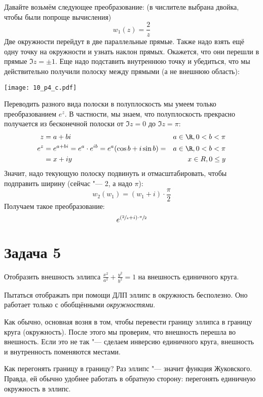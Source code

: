 	Давайте возьмём следующее преобразование: (в числителе выбрана двойка, чтобы были попроще вычисления)
	\[ w_1(z) = \frac{2}{z} \]
	Две окружности перейдут в две параллельные прямые.
	Также надо взять ещё одну точку на окружности и узнать наклон прямых.
	Окажется, что они перешли в прямые $\Im z = \pm 1$.
	Еще надо подставить внутреннюю точку и убедиться, что мы действительно получили полоску между прямыми (а не внешнюю область):
	\begin{center}
		\texttt{[image: 10\_p4\_c.pdf]}
	\end{center}

	Переводить разного вида полоски в полуплоскость мы умеем только преобразованием $e^z$.
	В частности, мы знаем, что полуплоскость прекрасно получается из бесконечной полоски от $\Im z = 0$ до $\Im z = \pi$:
	\begin{align*}
		z &= a + bi & a \in \R, 0 < b < \pi \\
		e^z &= e^{a+bi} = e^a\cdot e^{ib} = e^a(\cos b + i \sin b) = & a \in \R, 0 < b < \pi \\
		&= x + iy & x \in R, 0 \le y
	\end{align*}
	Значит, надо текующую полоску подвинуть и отмасштабировать, чтобы подправить ширину (сейчас "--- 2, а надо $\pi$):
	\[
		w_2(w_1) = (w_1 + i)\cdot \frac{\pi}{2}
	\]
	Получаем такое преобразование:
	\[
		e^{\left(\sfrac{2}{z}+i\right)\cdot\sfrac{\pi}{2}}
	\]

\section{Задача 5}
	Отобразить внешность эллипса $\frac{x^2}{a^2}+\frac{y^2}{b^2}=1$ на внешность единичного круга.

	\begin{Rem}
		Пытаться отображать при помощи ДЛП эллипс в окружность бесполезно.
		Оно работает только с обобщёнными \textit{окружностями}.
	\end{Rem}

	Как обычно, основная возня в том, чтобы перевести границу эллипса в границу круга (окружность).
	После этого мы проверим, что внешность перешла во внешность.
	Если это не так "--- сделаем инверсию единичного круга, внешность и внутренность поменяются местами.

	Как перегонять границу в границу?
	Раз эллипс "--- значит функция Жуковского.
	Правда, ей обычно удобнее работать в обратную сторону: перегонять единичную окружность в эллипс.

